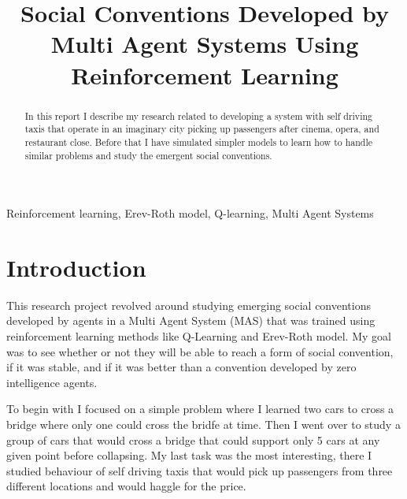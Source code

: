 \documentclass[conference]{IEEEtran}
\begin{document}
  
  \title{Social Conventions Developed by Multi Agent Systems Using Reinforcement Learning}
  
  \author{
  }

\maketitle

\begin{abstract}
  In this report I describe my research related to developing a system with self driving taxis that operate in an imaginary city picking up passengers after cinema, opera, and restaurant close. Before that I have simulated simpler models to learn how to handle similar problems and study the emergent social conventions.
\end{abstract}

\begin{IEEEkeywords}
  Reinforcement learning, Erev-Roth model, Q-learning, Multi Agent Systems
\end{IEEEkeywords}

\section{Introduction}
This research project revolved around studying emerging social conventions developed by agents in a Multi Agent System (MAS) that was trained using reinforcement learning methods like Q-Learning and Erev-Roth model. My goal was to see whether or not they will be able to reach a form of social convention, if it was stable, and if it was better than a convention developed by zero intelligence agents.

To begin with I focused on a simple problem where I learned two cars to cross a bridge where only one could cross the bridfe at time. Then I went over to study a group of cars that would cross a bridge that could support only 5 cars at any given point before collapsing. My last task was the most interesting, there I studied behaviour of self driving taxis that would pick up passengers from three different locations and would haggle for the price.
\end{document}
